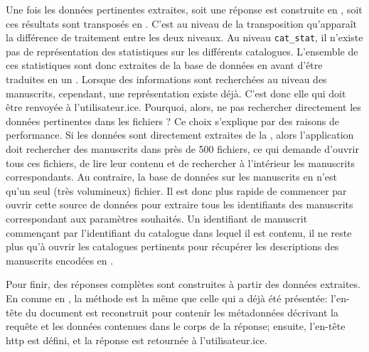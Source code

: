 Une fois les données pertinentes extraites, soit une réponse est construite en \json{}, soit ces résultats sont transposés en \tei{}. C'est au niveau de la transposition qu'apparaît la différence de traitement entre les deux niveaux. Au niveau \texttt{cat\_stat}, il n'existe pas de représentation \tei{} des statistiques sur les différents catalogues. L'ensemble de ces statistiques sont donc extraites de la base de données en \json{} avant d'être traduites en un \tei{}. Lorsque des informations sont recherchées au niveau des manuscrits, cependant, une représentation \tei{} existe déjà. C'est donc elle qui doit être renvoyée à l'utilisateur.ice. Pourquoi, alors, ne pas rechercher directement les données pertinentes dans les fichiers \tei{}? Ce choix s'explique par des raisons de performance. Si les données sont directement extraites de la \tei{}, alors l'application doit rechercher des manuscrits dans près de 500 fichiers, ce qui demande d'ouvrir tous ces fichiers, de lire leur contenu et de rechercher à l'intérieur les manuscrits correspondants. Au contraire, la base de données sur les manuscrits en \json{} n'est qu'un seul (très volumineux) fichier. Il est donc plus rapide de commencer par ouvrir cette source de données pour extraire tous les identifiants des manuscrits correspondant aux paramètres souhaités. Un identifiant de manuscrit commençant par l'identifiant du catalogue dans lequel il est contenu, il ne reste plus qu'à ouvrir les catalogues pertinents pour récupérer les descriptions des manuscrits encodées en \tei{}.

Pour finir, des réponses complètes sont construites à partir des données extraites. En \json{} comme en \tei{}, la méthode est la même que celle qui a déjà été présentée: l'en-tête du document est reconstruit pour contenir les métadonnées décrivant la requête et les données contenues dans le corps de la réponse; ensuite, l'en-tête \gls{http} est défini, et la réponse est retournée à l'utilisateur.ice.

